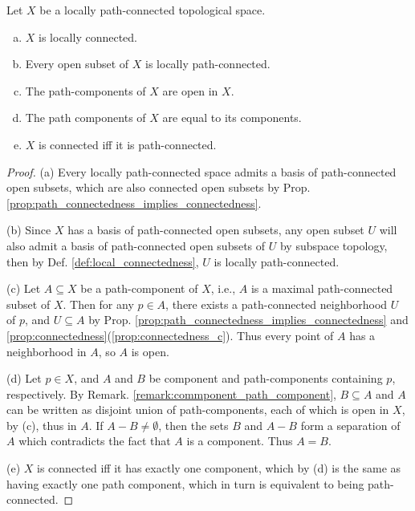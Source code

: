 \documentclass[11pt,a4paper]{article}
\begin{document}
\begin{proposition}
Let $X$ be a locally path-connected topological space.
\begin{enumerate}[(a)]
    \item $X$ is locally connected.
    \item Every open subset of $X$ is locally path-connected.
    \item The path-components of $X$ are open in $X$.
    \item The path components of $X$ are equal to its components.
    \item $X$ is connected iff it is path-connected.
\end{enumerate}
\end{proposition}

\begin{proof}
\noindent(a) Every locally path-connected space admits a basis of path-connected open subsets, which are also connected open subsets by Prop. \ref{prop:path_connectedness_implies_connectedness}.

\noindent(b) Since $X$ has a basis of path-connected open subsets, any open subset $U$ will also admit a basis of path-connected open subsets of $U$ by subspace topology, then by Def. \ref{def:local_connectedness}, $U$ is locally path-connected.

\noindent(c) Let $A\subseteq X$ be a path-component of $X$, i.e., $A$ is a maximal path-connected subset of $X$. Then for any $p\in A$, there exists a  path-connected neighborhood $U$ of $p$, and $U\subseteq A$ by Prop. \ref{prop:path_connectedness_implies_connectedness} and \ref{prop:connectedness}(\ref{prop:connectedness_c}). Thus every point of $A$ has a neighborhood in $A$, so $A$ is open.

\noindent(d) Let $p\in X$, and $A$ and $B$ be component and path-components containing $p$, respectively. By Remark. \ref{remark:commponent_path_component}, $B\subseteq A$ and $A$ can be written as disjoint union of path-components, each of which is open in $X$, by (c), thus in $A$. If $A-B\neq \emptyset$, then the sets $B$ and $A-B$ form a separation of $A$ which contradicts the fact that $A$ is a component. Thus $A = B$.

\noindent(e) $X$ is connected iff it has exactly one component, which by (d) is the same as having exactly one path component, which in turn is equivalent to being path-connected.
\end{proof}
\end{document}
